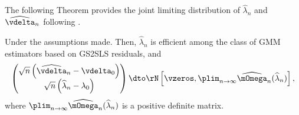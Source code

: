 \documentclass[english,12pt]{book}\usepackage[]{graphicx}\usepackage[]{xcolor}
\begin{document}
The following Theorem provides the joint limiting distribution of $\widehat{\lambda}_n$ and $\widehat{\vdelta}_n$ following \cite{arraiz2010spatial}. 

\begin{theorem}
Under the assumptions made. Then, $\widehat{\lambda}_n$ is efficient among the class of GMM estimators based on GS2SLS residuals, and
\begin{equation*}
\begin{pmatrix}
\sqrt{n}\left(\widehat{\vdelta}_n - \vdelta_0\right)\\
\sqrt{n}\left(\widehat{\lambda}_n - \lambda_0\right)
\end{pmatrix}
\dto
\rN\left[\vzeros, \plim_{n\to\infty}\widehat{\mOmega}_n(\widehat{\lambda}_n)\right],
\end{equation*}
%
where $\plim_{n\to\infty}\widehat{\mOmega}_n(\widehat{\lambda}_n)$ is a positive definite matrix. 
\end{theorem}
\end{document}
